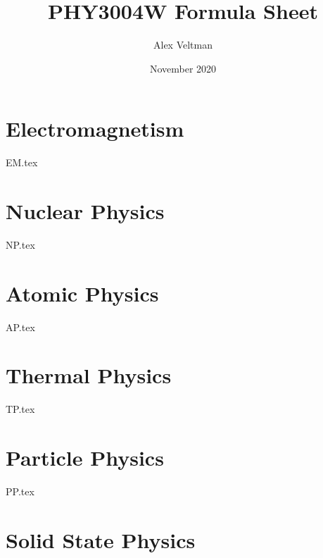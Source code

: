 \documentclass[a4paper, twocolumn]{article}
\title{PHY3004W Formula Sheet}
\author{Alex Veltman}
\date{November 2020}
\makeatletter
\numberwithin{equation}{section}
\renewcommand{\maketitle} %
{ \begingroup \vskip 10pt \begin{center} \large {\bf \@title}
	\vskip 10pt \large \@author \hskip 20pt \@date \end{center}
  \vskip 10pt \endgroup \setcounter{footnote}{0} }
\makeatother
\begin{document}
\maketitle

\section{Electromagnetism}
{EM.tex}

\section{Nuclear Physics}
{NP.tex}

\section{Atomic Physics}
{AP.tex}

\section{Thermal Physics}
{TP.tex}

\section{Particle Physics}
{PP.tex}

\section{Solid State Physics}
\end{document}
